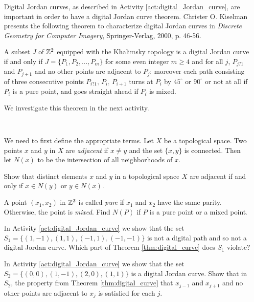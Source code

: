 Digital Jordan curves, as described in Activity \ref{act:digital_Jordan_curve}, are important in order to have a digital Jordan curve theorem. Christer O. Kiselman presents the following theorem to characterize digital Jordan curves in \emph{Discrete Geometry for Computer Imagery}, Springer-Verlag, 2000, p. 46-56. 

\begin{theorem} \label{thm:digital_curve} A subset $J$ of $\mathbb{Z}^2$ equipped with the Khalimsky topology is a digital Jordan curve if and only if $J = \{P_1, P_2, \ldots, P_m\}$ for some even integer $m \geq 4$ and for all $j$, $P_{j?1}$ and $P_{j+1}$ and no other points are adjacent to $P_j$; moreover each path consisting of three consecutive points $P_{i?1}$, $P_i$, $P_{i+1}$ turns at $P_i$ by $45^{\circ}$ or $90^{\circ}$ or not at all if $P_i$ is a pure point, and goes straight ahead if $P_i$ is mixed.
\end{theorem}

We investigate this theorem in the next activity.

\begin{activity} ~
\ba
\item We need to first define the appropriate terms. Let $X$ be a topological space. Two points $x$ and $y$ in $X$ are \emph{adjacent} if $x \neq y$ and the set $\{x, y\}$ is connected. Then let $N(x)$ to be the intersection of all neighborhoods of $x$. 

Show that distinct elements $x$ and $y$ in a topological space $X$ are adjacent if and only if $x \in N(y)$ or $y \in N(x)$. 

\item A point $(x_1,x_2)$ in $\mathbb{Z}^2$ is called \emph{pure} if $x_1$ and $x_2$ have the same parity. Otherwise, the point is \emph{mixed}. Find $N(P)$ if $P$ is a pure point or a mixed point.

\item In Activity \ref{act:digital_Jordan_curve} we show that the set $S_1 = \{(1,-1), (1,1), (-1,1), (-1,-1)\}$ is not a digital path and so not a digital Jordan curve. Which part of Theorem \ref{thm:digital_curve} does $S_1$ violate? 

\item In Activity \ref{act:digital_Jordan_curve} we show that the set $S_2 = \{(0,0), (1,-1), (2,0), (1,1)\}$ is a digital Jordan curve. Show that in $S_2$, the property from Theorem \ref{thm:digital_curve} that $x_{j-1}$ and $x_{j+1}$ and no other points are adjacent to $x_j$ is satisfied for each $j$.


\ea

\end{activity}

